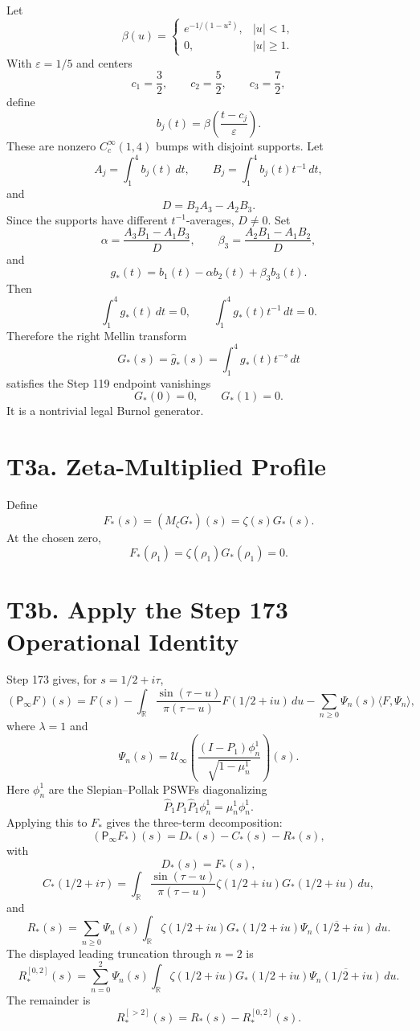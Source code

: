 \documentclass[11pt]{article}
\newcommand{\Psym}{\mathsf P_\infty}
\newcommand{\Mz}{M_\zeta}
\newcommand{\Uinf}{\mathcal U_\infty}
\begin{document}
Let
\[
\beta(u)=
\begin{cases}
e^{-1/(1-u^2)},& |u|<1,\\
0,& |u|\ge1.
\end{cases}
\]
With \(\varepsilon=1/5\) and centers
\[
c_1=\frac32,\qquad c_2=\frac52,\qquad c_3=\frac72,
\]
define
\[
b_j(t)=\beta\left(\frac{t-c_j}{\varepsilon}\right).
\]
These are nonzero \(C_c^\infty(1,4)\) bumps with disjoint supports.  Let
\[
A_j=\int_1^4 b_j(t)\,dt,\qquad
B_j=\int_1^4 b_j(t)t^{-1}\,dt,
\]
and
\[
D=B_2A_3-A_2B_3.
\]
Since the supports have different \(t^{-1}\)-averages, \(D\ne0\).  Set
\[
\alpha=\frac{A_3B_1-A_1B_3}{D},
\qquad
\beta_3=\frac{A_2B_1-A_1B_2}{D},
\]
and
\[
g_*(t)=b_1(t)-\alpha b_2(t)+\beta_3 b_3(t).
\]
Then
\[
\int_1^4 g_*(t)\,dt=0,\qquad
\int_1^4 g_*(t)t^{-1}\,dt=0.
\]
Therefore the right Mellin transform
\[
G_*(s)=\widehat g_*(s)=\int_1^4 g_*(t)t^{-s}\,dt
\]
satisfies the Step 119 endpoint vanishings
\[
G_*(0)=0,\qquad G_*(1)=0.
\]
It is a nontrivial legal Burnol generator.

\section{T3a. Zeta-Multiplied Profile}

Define
\[
F_*(s)=(\Mz G_*)(s)=\zeta(s)G_*(s).
\]
At the chosen zero,
\[
F_*(\rho_1)=\zeta(\rho_1)G_*(\rho_1)=0.
\]

\section{T3b. Apply the Step 173 Operational Identity}

Step 173 gives, for \(s=1/2+i\tau\),
\[
(\Psym F)(s)
=
F(s)
-
\int_{\mathbb R}
\frac{\sin(\tau-u)}{\pi(\tau-u)}
F(1/2+iu)\,du
-
\sum_{n\ge0}\Psi_n(s)\langle F,\Psi_n\rangle,
\]
where \(\lambda=1\) and
\[
\Psi_n(s)=
\Uinf\left(
\frac{(I-P_1)\phi_n^1}{\sqrt{1-\mu_n^1}}
\right)(s).
\]
Here \(\phi_n^1\) are the Slepian--Pollak PSWFs diagonalizing
\[
\widehat P_1P_1\widehat P_1\phi_n^1=\mu_n^1\phi_n^1.
\]
Applying this to \(F_*\) gives the three-term decomposition:
\[
(\Psym F_*)(s)=D_*(s)-C_*(s)-R_*(s),
\]
with
\[
D_*(s)=F_*(s),
\]
\[
C_*(1/2+i\tau)=
\int_{\mathbb R}
\frac{\sin(\tau-u)}{\pi(\tau-u)}
\zeta(1/2+iu)G_*(1/2+iu)\,du,
\]
and
\[
R_*(s)=
\sum_{n\ge0}\Psi_n(s)
\int_{\mathbb R}
\zeta(1/2+iu)G_*(1/2+iu)
\overline{\Psi_n(1/2+iu)}\,du.
\]
The displayed leading truncation through \(n=2\) is
\[
R_*^{[0,2]}(s)=
\sum_{n=0}^{2}\Psi_n(s)
\int_{\mathbb R}
\zeta(1/2+iu)G_*(1/2+iu)
\overline{\Psi_n(1/2+iu)}\,du.
\]
The remainder is
\[
R_*^{[>2]}(s)=R_*(s)-R_*^{[0,2]}(s).
\]
\end{document}
